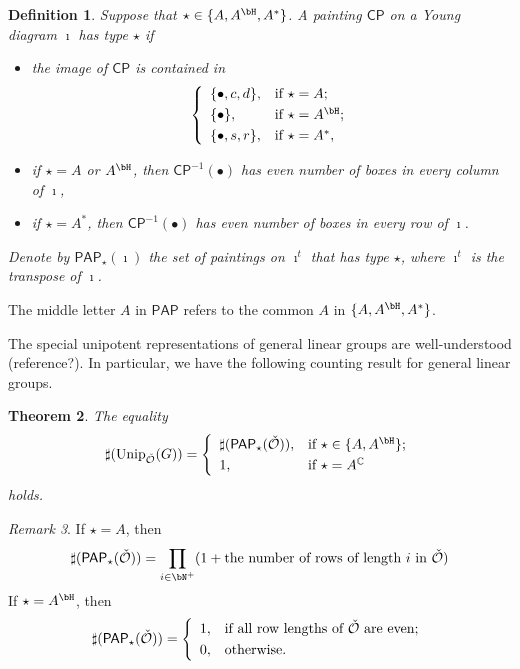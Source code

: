 \documentclass[12pt,a4paper]{amsart}
\newcommand{\CO}{{\mathcal {O}}}
\newcommand{\CP}{{\mathcal {P}}}
\numberwithin{equation}{section}
\newtheorem{thm}{Theorem}[section]
\newtheorem{defn}[thm]{Definition}
\theoremstyle{remark}
\newtheorem{remark}[thm]{Remark}
\def\Unip{\mathrm{Unip}}
\def\CP{\mathsf{CP}}
\def\PAP{\mathsf{PAP}}
\begin{document}
\begin{defn}\label{defpbp0}
  Suppose that $\star\in \{A, A^\bH, A^*\}$. A painting $\CP$ on a Young diagram
  $\imath$ has type $\star$ if
  \begin{itemize}
    \item the image of $\CP$ is contained in
          \[
          \left\{
          \begin{array}{ll}
            \{\bullet, c, d\}, &\hbox{if $\star=A$}; \smallskip\\
            \{\bullet\}, &\hbox{if $\star=A^\bH$}; \smallskip\\
            \{\bullet, s, r\}, &\hbox{if $\star=A^*$},            \end{array}
        \right.
          \]
    \item if $\star=A$ or $A^\bH$, then $\CP^{-1}(\bullet)$ has even number of
          boxes in every column of $\imath$,
    \item if $\star=A^*$, then $\CP^{-1}(\bullet)$ has even number of boxes in
          every row of $\imath$.
  \end{itemize}
  Denote by $\PAP_\star(\imath)$ the set of paintings on $\imath^{t}$ that has type $\star$, where $\imath^{t}$
  is the transpose of $\imath$.
   \end{defn}


The middle letter $A$ in $\PAP$ refers to the common $A$ in $\{A, A^\bH, A^*\}$.

The special unipotent representations of general linear groups are
well-understood (reference?). In particular, we have the following counting result for general linear groups.

\begin{thm}\label{GLcase}
  The equality
  \[
    \sharp(\Unip_{\check \CO}(G))= \left\{
      \begin{array}{ll}
        \sharp(\PAP_\star(\check \CO)), &\hbox{if $\star\in\{A, A^\bH\}$}; \smallskip\\
        1, &\hbox{if $\star=A^\C$}  \end{array}
    \right.
  \]
  holds.

\end{thm}
\begin{remark}
  If $\star=A$, then
  \[
    \sharp(\PAP_\star(\check \CO))=\prod_{i\in \bN^+} (1+\textrm{the
      number of rows of length $i$ in $\check \CO$})
  \]
  If $\star=A^\bH$, then
  \[
    \sharp(\PAP_\star(\check \CO))= \left\{
      \begin{array}{ll}
        1, &\hbox{if all row lengths of $\check \CO$ are even}; \smallskip\\
        0, &\hbox{otherwise}.  \end{array}
    \right.
  \]

\end{remark}
\end{document}
